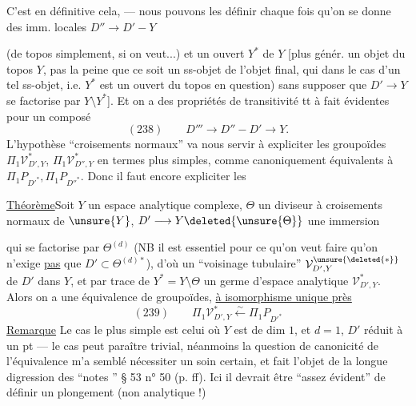 C'est en définitive cela,   --- nous pouvons les définir chaque fois qu'on se donne des imm. locales $D''\longrightarrow D'\mathbin{-}Y$

(de topos simplement, si on veut...) et un ouvert $Y^{*}$ de $Y$ [plus génér. un objet du topos  $Y$, pas la peine  que ce soit un ss-objet de l'objet final, qui dans le cas d'un tel ss-objet, i.e.  $Y^{*}$ est un ouvert du topos en question) sans supposer que $D'\to Y$ se factorise par $Y\setminus Y^{*}$]. Et on a des propriétés de transitivité tt à fait évidentes pour un composé
\[
(238)\qquad D'''\longrightarrow D''\mathbin{-}D'\longrightarrow Y.
\]
L'hypothèse ``croisements normaux'' va nous servir à expliciter les groupoïdes $\Pi_1\mathcal V^{*}_{D',Y}$, $\Pi_1\mathcal V^{*}_{D'',Y}$ en termes plus simples, comme canoniquement équivalents à $\Pi_1P_{D'^{*}},\Pi_1P_{D''^{*}}$. Donc il faut encore expliciter les 

\uline{Théorème}\quad Soit $Y$ un espace analytique complexe, $\Theta$ un diviseur à croisements normaux de $\unsure{Y}$, $D'\longrightarrow Y\deleted{\unsure{\Theta}}$ une immersion

 qui se factorise par $\Theta^{(d)}$ (NB il est essentiel pour ce qu'on veut faire qu'on n'exige \uline{pas} que $D'\subset\Theta^{(d)*}$),  d'où un ``voisinage tubulaire'' $\mathcal V_{D',Y}^{\unsure{\deleted{*}}}$ de $D'$ dans $Y$, et par trace de $Y^{*}=Y\setminus\Theta$ un  germe d'espace analytique $\mathcal V^{*}_{D',Y}$. Alors on a une équivalence de groupoïdes, \uline{ à  isomorphisme unique près}
\[
(239)\qquad\Pi_1\mathcal V^{*}_{D',Y}\xleftarrow{\sim}\Pi_1P_{D'^{*}}
\]
\uline{Remarque} Le cas le plus simple est celui où $Y$ est de dim $1$, et $d=1$, $D'$ réduit à un pt --- le  cas peut paraître trivial, néanmoins la question de canonicité de l'équivalence m'a semblé nécessiter un soin certain, et fait l'objet de la longue digression des ``notes '' § 53 n° 50 (p.  ff). Ici  il devrait être ``assez évident'' de définir  un plongement   (non analytique !)

